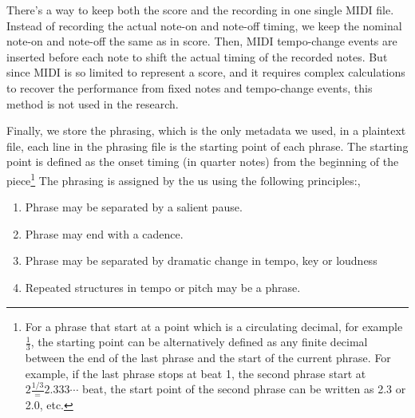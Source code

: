 There's a way to keep both the score and the recording in one single MIDI file. Instead of recording the actual note-on and note-off timing, we keep the nominal note-on and note-off the same as in score. Then, MIDI tempo-change events are inserted before each note to shift the actual timing of the recorded notes. But since MIDI is so limited to represent a score, and it requires complex calculations to recover the performance from fixed notes and tempo-change events, this method is not used in the research.


Finally, we store the phrasing, which is the only metadata we used, in a plaintext file, each line in the phrasing file is the starting point of each phrase. The starting point is defined as the onset timing (in quarter notes) from the beginning of the piece\footnote{For a phrase that start at a point which is a circulating decimal, for example $\frac{1}{3}$, the starting point can be alternatively defined as any finite decimal between the end of the last phrase and the start of the current phrase. For example, if the last phrase stops at beat 1, the second phrase start at $2\frac{1/3}=2.333\cdots$ beat, the start point of the second phrase can be written as 2.3 or 2.0, etc.} The phrasing is assigned by the us using the following principles:, 
\begin{enumerate}
   \item Phrase may be separated by a salient pause.
   \item Phrase may end with a cadence.
   \item Phrase may be separated by dramatic change in tempo, key or loudness
   \item Repeated structures in tempo or pitch may be a phrase.
\end{enumerate}

